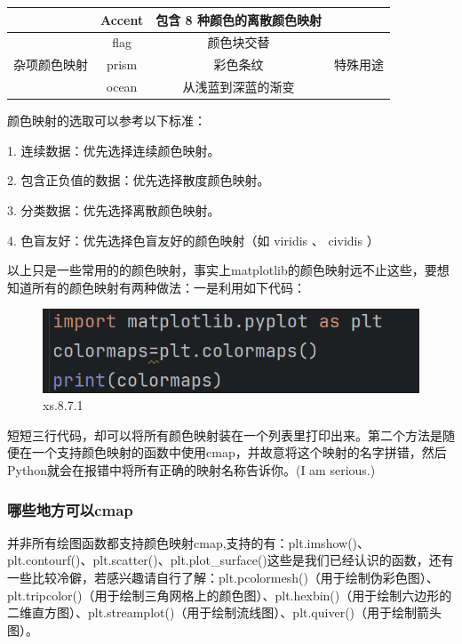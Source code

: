 \documentclass[12pt]{article}
\begin{document}
\begin{table}[H]
\begin{tabular}{|c|c|c|c|}
                        & Accent   & 包含 8 种颜色的离散颜色映射    &                                                 \\ \hline
\multirow{3}{*}{杂项颜色映射} & flag     & 颜色块交替              & \multirow{3}{*}{特殊用途}                           \\ \cline{2-3}
                        & prism    & 彩色条纹               &                                                 \\ \cline{2-3}
                        & ocean    & 从浅蓝到深蓝的渐变          &                                                 \\ \hline
\end{tabular}
\end{table}

颜色映射的选取可以参考以下标准：

1. 连续数据：优先选择连续颜色映射。

2. 包含正负值的数据：优先选择散度颜色映射。

3. 分类数据：优先选择离散颜色映射。

4. 色盲友好：优先选择色盲友好的颜色映射（如   viridis  、  cividis  ）

以上只是一些常用的的颜色映射，事实上matplotlib的颜色映射远不止这些，要想知道所有的颜色映射有两种做法：一是利用如下代码：
\begin{figure}[H]
    \centering
    \includegraphics[width=0.5\linewidth]{颜色映射 program1.png}
    \caption{xs.8.7.1}
    \label{fig:enter-label}
\end{figure}
短短三行代码，却可以将所有颜色映射装在一个列表里打印出来。第二个方法是随便在一个支持颜色映射的函数中使用cmap，并故意将这个映射的名字拼错，然后Python就会在报错中将所有正确的映射名称告诉你。(I am serious.)

\subsubsection{哪些地方可以cmap}
并非所有绘图函数都支持颜色映射cmap,支持的有：plt.imshow()、plt.contourf()、plt.scatter()、plt.plot\_surface()这些是我们已经认识的函数，还有一些比较冷僻，若感兴趣请自行了解：plt.pcolormesh()（用于绘制伪彩色图）、 plt.tripcolor()（用于绘制三角网格上的颜色图）、plt.hexbin()（用于绘制六边形的二维直方图）、plt.streamplot()（用于绘制流线图）、plt.quiver()（用于绘制箭头图）。
\end{document}
